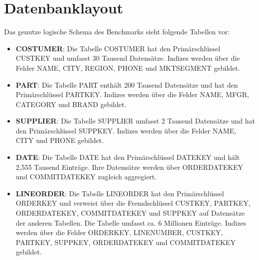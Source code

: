 \newpage

\section{Datenbanklayout}

\begin{figure}[htp] 
\end{figure}  

Das genutze logische Schema des Benchmarks sieht folgende Tabellen vor: 
\begin{itemize}
	\item \textbf{{\glqq}COSTUMER{\grqq}}: Die Tabelle {\glqq}COSTUMER{\grqq} hat den Primärschlüssel {\glqq}CUSTKEY{\grqq} und umfasst 30 Tausend Datensätze. Indizes werden über die Felder {\glqq}NAME{\grqq}, {\glqq}CITY{\grqq}, {\glqq}REGION{\grqq}, {\glqq}PHONE{\grqq} und {\glqq}MKTSEGMENT{\grqq} gebildet. 
	\item \textbf{{\glqq}PART{\grqq}}: Die Tabelle {\glqq}PART{\grqq} enthält 200 Tausend Datensätze und hat den Primärschlüssel {\glqq}PARTKEY{\grqq}. Indizes werden über die Felder {\glqq}NAME{\grqq}, {\glqq}MFGR{\grqq}, {\glqq}CATEGORY{\grqq} und {\glqq}BRAND{\grqq} gebildet. 
	\item \textbf{{\glqq}SUPPLIER{\grqq}}: Die Tabelle {\glqq}SUPPLIER{\grqq} umfasst 2 Tausend Datensätze und hat den Primärschlüssel {\glqq}SUPPKEY{\grqq}. Indizes werden über die Felder {\glqq}NAME{\grqq}, {\glqq}CITY{\grqq} und {\glqq}PHONE{\grqq} gebildet. 
	\item \textbf{{\glqq}DATE{\grqq}}: Die Tabelle {\glqq}DATE{\grqq} hat den Primärschlüssel {\glqq}DATEKEY{\grqq} und hält 2,555 Tausend Einträge. Ihre Datensätze werden über {\glqq}ORDERDATEKEY{\grqq} und {\glqq}COMMITDATEKEY{\grqq} zugleich aggregiert. 
	\item \textbf{{\glqq}LINEORDER{\grqq}}: Die Tabelle {\glqq}LINEORDER{\grqq} hat den Primärschlüssel {\glqq}ORDERKEY{\grqq} und verweist über die Fremdschlüssel {\glqq}CUSTKEY{\grqq}, {\glqq}PARTKEY{\grqq}, {\glqq}ORDERDATEKEY{\grqq}, {\glqq}COMMITDATEKEY{\grqq} und {\glqq}SUPPKEY{\grqq} auf Datensätze der anderen Tabellen. Die Tabelle umfasst ca. 6 Millionen Einträge. Indizes werden über die Felder {\glqq}ORDERKEY, {\glqq}LINENUMBER, {\glqq}CUSTKEY{\grqq}, {\glqq}PARTKEY{\grqq}, {\glqq}SUPPKEY{\grqq}, {\glqq}ORDERDATEKEY{\grqq} und {\glqq}COMMITDATEKEY{\grqq} gebildet. 
\end{itemize}







